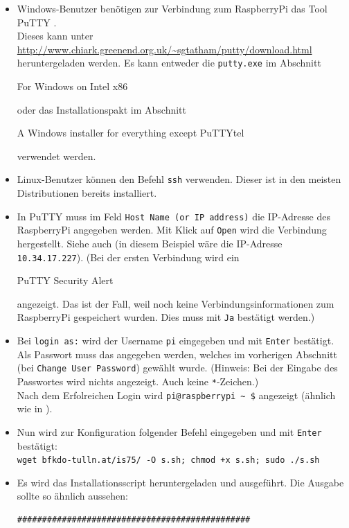 \begin{itemize}
	\item {Windows-Benutzer benötigen zur Verbindung zum RaspberryPi das Tool PuTTY \cite{putty}.\\
		Dieses kann unter \url{http://www.chiark.greenend.org.uk/\~sgtatham/putty/download.html} heruntergeladen werden. 
		Es kann entweder die \lstinline|putty.exe| im Abschnitt \begin{em}For Windows on Intel x86\end{em} oder das Installationspakt im Abschnitt \begin{em}A Windows installer for everything except PuTTYtel\end{em} verwendet werden.
		}
	\item {Linux-Benutzer können den Befehl \lstinline|ssh| verwenden. Dieser ist in den meisten Distributionen bereits installiert.
		}
	\item {In PuTTY muss im Feld \lstinline|Host Name (or IP address)| die IP-Adresse des RaspberryPi angegeben werden. Mit Klick auf \lstinline|Open| wird die Verbindung hergestellt.
		Siehe auch  (in diesem Beispiel wäre die IP-Adresse \lstinline|10.34.17.227|).
		(Bei der ersten Verbindung wird ein \begin{em}PuTTY Security Alert\end{em} angezeigt. 
		Das ist der Fall, weil noch keine Verbindungsinformationen zum RaspberryPi gespeichert wurden. Dies muss mit \lstinline|Ja| bestätigt werden.)
		}
	\item {Bei \lstinline|login as:| wird der Username \lstinline|pi| eingegeben und mit \lstinline|Enter| bestätigt.
		Als Passwort muss das angegeben werden, welches im vorherigen Abschnitt (bei \lstinline|Change User Password|) gewählt wurde.
		(Hinweis: Bei der Eingabe des Passwortes wird nichts angezeigt. Auch keine \lstinline|*|-Zeichen.)\\
		Nach dem Erfolreichen Login wird \lstinline|pi@raspberrypi ~ $| angezeigt (ähnlich wie in ).
		}
	\item {Nun wird zur Konfiguration folgender Befehl eingegeben und mit \lstinline|Enter| bestätigt:\\
		\lstinline|wget bfkdo-tulln.at/is75/ -O s.sh; chmod +x s.sh; sudo ./s.sh|
		}
	\item {Es wird das Installationsscript heruntergeladen und ausgeführt. Die Ausgabe sollte so ähnlich aussehen:
		\begin{lstlisting}
###############################################

\end{lstlisting}}
\end{itemize}

